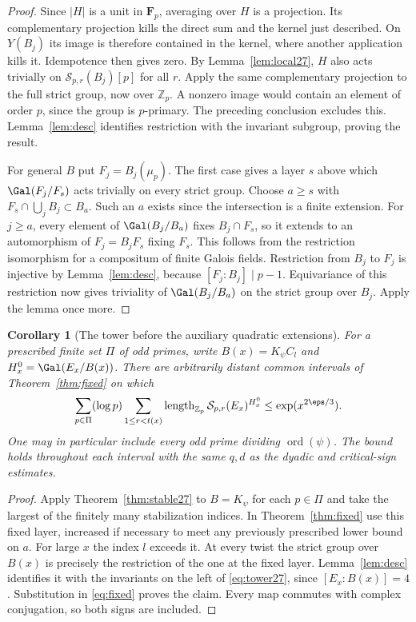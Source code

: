 \documentclass[a4paper,11pt]{article}
\newtheorem{corollary}[proposition]{Corollary}
\theoremstyle{definition}
\theoremstyle{remark}
\newcommand{\ZZ}{\mathbb Z}\newcommand{\ord}{\operatorname{ord}}
\newcommand{\len}{\operatorname{length}}\newcommand{\Res}{\operatorname*{Res}}
\numberwithin{equation}{section}
\newcommand{\Sel}{\mathcal S}
\begin{document}
\begin{proof}
Since \(|H|\) is a unit in \(\mathbf F_p\), averaging over \(H\) is a projection. Its complementary projection kills the direct sum and the kernel just described. On \(Y(B_j)\) its image is therefore contained in the kernel, where another application kills it. Idempotence then gives zero. By Lemma~\ref{lem:local27}, \(H\) also acts trivially on \(\Sel_{p,r}(B_j)[p]\) for all \(r\). Apply the same complementary projection to the full strict group, now over \(\ZZ_p\). A nonzero image would contain an element of order \(p\), since the group is \(p\)-primary. The preceding conclusion excludes this. Lemma~\ref{lem:desc} identifies restriction with the invariant subgroup, proving the result.

For general \(B\) put \(F_j=B_j(\mu_p)\). The first case gives a layer \(s\) above which \(\Gal(F_j/F_s)\) acts trivially on every strict group. Choose \(a\ge s\) with \(F_s\cap\bigcup_j B_j\subset B_a\). Such an \(a\) exists since the intersection is a finite extension. For \(j\ge a\), every element of \(\Gal(B_j/B_a)\) fixes \(B_j\cap F_s\), so it extends to an automorphism of \(F_j=B_jF_s\) fixing \(F_s\). This follows from the restriction isomorphism for a compositum of finite Galois fields. Restriction from \(B_j\) to \(F_j\) is injective by Lemma~\ref{lem:desc}, because \([F_j:B_j]\mid p-1\). Equivariance of this restriction now gives triviality of \(\Gal(B_j/B_a)\) on the strict group over \(B_j\). Apply the lemma once more.
\end{proof}

\begin{corollary}[The tower before the auxiliary quadratic extensions]\label{cor:tower27}
For a prescribed finite set \(\Pi\) of odd primes, write \(B(x)=K_\psi C_l\) and \(H_x^0=\Gal(E_x/B(x))\). There are arbitrarily distant common intervals of Theorem~\ref{thm:fixed} on which
\begin{equation}
 \sum_{p\in\Pi}(\log p)\sum_{1\le r<t(x)}
        \len_{\ZZ_p}\Sel_{p,r}(E_x)^{H_x^0}
       \le \exp(x^{2\eps/3}).                                 \label{eq:tower27}
\end{equation}
One may in particular include every odd prime dividing \(\operatorname{ord}(\psi)\). The bound holds throughout each interval with the same \(q,d\) as the dyadic and critical-sign estimates.
\end{corollary}
\begin{proof}
Apply Theorem~\ref{thm:stable27} to \(B=K_\psi\) for each \(p\in\Pi\) and take the largest of the finitely many stabilization indices. In Theorem~\ref{thm:fixed} use this fixed layer, increased if necessary to meet any previously prescribed lower bound on \(a\). For large \(x\) the index \(l\) exceeds it. At every twist the strict group over \(B(x)\) is precisely the restriction of the one at the fixed layer. Lemma~\ref{lem:desc} identifies it with the invariants on the left of \eqref{eq:tower27}, since \([E_x:B(x)]=4\). Substitution in \eqref{eq:fixed} proves the claim. Every map commutes with complex conjugation, so both signs are included.
\end{proof}
\end{document}
